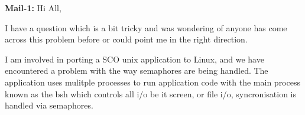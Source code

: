 \documentclass[
	letterpaper, %
	12pt, %
	unnumberedsections, %
	twoside, %
]{LTJournalArticle}
\begin{document}
\begin{appendices}
{		\noindent\textbf{Mail-1:} Hi All,

		I have a question which is a bit tricky and was
		wondering of anyone has come across this problem
		before or could point me in the right direction.

		I am involved in porting a SCO unix application to
		Linux, and we have encountered a problem with the way
		semaphores  are being handled. The application uses
		mulitple processes to run application code with the
		main process known as the bsh which controls all i/o
		be it screen, or file i/o, syncronisation is handled
		via semaphores. \\


	}
\end{appendices}
%
\end{document}
